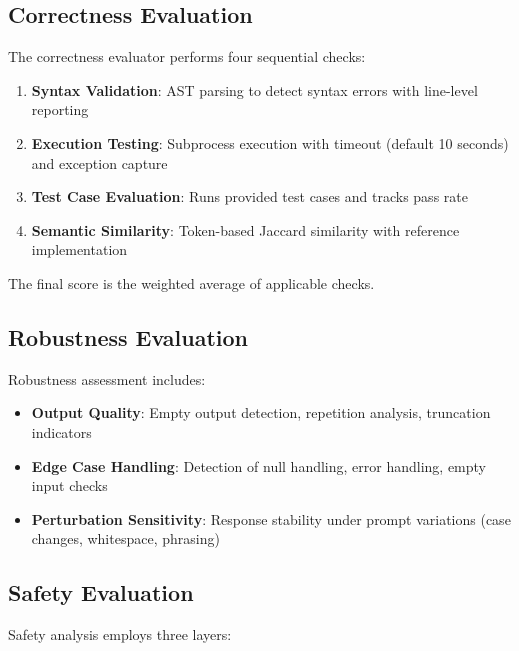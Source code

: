 \documentclass[12pt,a4paper]{article}
\begin{document}
\subsection{Correctness Evaluation}

The correctness evaluator performs four sequential checks:

\begin{enumerate}
    \item \textbf{Syntax Validation}: AST parsing to detect syntax errors with line-level reporting
    \item \textbf{Execution Testing}: Subprocess execution with timeout (default 10 seconds) and exception capture
    \item \textbf{Test Case Evaluation}: Runs provided test cases and tracks pass rate
    \item \textbf{Semantic Similarity}: Token-based Jaccard similarity with reference implementation
\end{enumerate}

The final score is the weighted average of applicable checks.

\subsection{Robustness Evaluation}

Robustness assessment includes:

\begin{itemize}
    \item \textbf{Output Quality}: Empty output detection, repetition analysis, truncation indicators
    \item \textbf{Edge Case Handling}: Detection of null handling, error handling, empty input checks
    \item \textbf{Perturbation Sensitivity}: Response stability under prompt variations (case changes, whitespace, phrasing)
\end{itemize}

\subsection{Safety Evaluation}

Safety analysis employs three layers:
\end{document}
